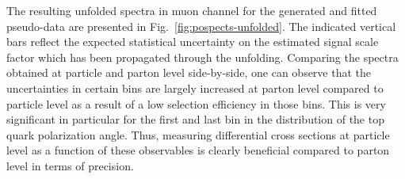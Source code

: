 {\hspace{0.03\textwidth}
}

The resulting unfolded spectra in muon channel for the generated and fitted pseudo-data are presented in Fig.~\ref{fig:pospects-unfolded}. The indicated vertical bars reflect the expected statistical uncertainty on the estimated signal scale factor which has been propagated through the unfolding. Comparing the spectra obtained at particle and parton level side-by-side, one can observe that the uncertainties in certain bins are largely increased at parton level compared to particle level as a result of a low selection efficiency in those bins. This is very significant in particular for the first and last bin in the distribution of the top quark polarization angle. Thus, measuring differential cross sections at particle level as a function of these observables is clearly beneficial compared to parton level in terms of precision.

